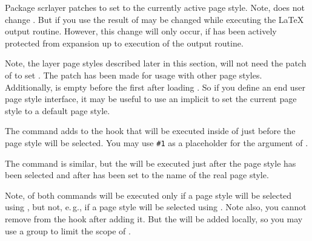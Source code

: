 \begin{Declaration}
\end{Declaration}
Package scrlayer patches  to set
 to the currently active page style. Note,
 does not change
. But if you use 
the result of  may be changed while executing the
\LaTeX{} output routine. However, this change will only occur, if
 has been actively protected from expansion up to
execution of the output routine.

Note, the layer page styles described later in this section, will not need the
patch of  to set . The
patch has been made for usage with other page styles. Additionally,
 is empty before the first
 after loading . So if you
define an end user page style interface, it may be useful to use an implicit
 to set the current page style to a default
page style.%
\EndIndexGroup


\begin{Declaration}
\end{Declaration}
The command  adds  to the hook
that will be executed inside of  just before
the page style will be selected. You may use \texttt{\#1} as a placeholder for
the argument of .

The command  is similar, but the 
will be executed just after the page style has been selected and after
 has been set to the name of the real
page style.

Note,  of both commands will be executed only
if a page style will be selected using , but
not, e.\,g., if a page style will be selected using
. Note also, you cannot remove 
from the hook after adding it. But the  will be added locally, so
you may use a group to limit the scope of .%
\EndIndexGroup


